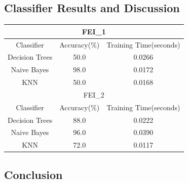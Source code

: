 \documentclass{article}
\begin{document}
\subsection*{Classifier Results and Discussion}
\clearpage
\begin{center}
	\begin{tabular}{|c|c|c|}
		\hline
		\multicolumn{3}{|c|}{FEI\_1} \\
		\hline
		Classifier & Accuracy(\%) & Training Time(seconds) \\
		\hline
		Decision Trees & 50.0 & 0.0266 \\
		\hline
		Naive Bayes & 98.0 & 0.0172 \\
		\hline
		KNN & 50.0 & 0.0168 \\		
		\hline
		\multicolumn{3}{|c|}{FEI\_2} \\
		\hline
		Classifier & Accuracy(\%) & Training Time(seconds) \\
		\hline
		Decision Trees & 88.0 & 0.0222 \\
		\hline
		Naive Bayes & 96.0 & 0.0390 \\
		\hline
		KNN & 72.0 & 0.0117 \\		
		\hline
	\end{tabular}
\end{center}
\subsection*{Conclusion}



\end{document}

